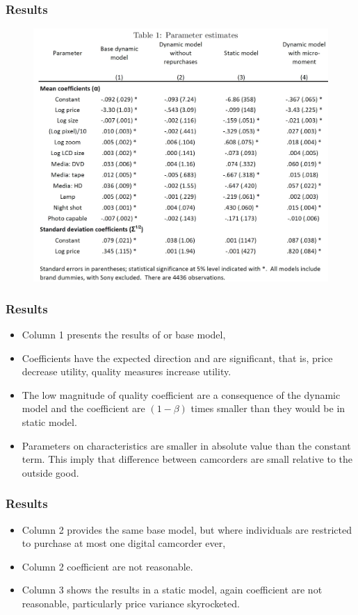 \documentclass{beamer}
\theoremstyle{definition}
\begin{document}
\begin{frame}
  \frametitle{Results}

  \begin{figure}
    \includegraphics[width=\linewidth]{Table 1.JPG}
  \end{figure}
\end{frame}

\begin{frame}
  \frametitle{Results}

  \begin{itemize}
    \item Column 1 presents the results of or base model,
    \item Coefficients have the expected direction and are significant, that is,
      price decrease utility, quality measures increase utility.
    \item The low magnitude of quality coefficient are a consequence of the
      dynamic model and the coefficient are $(1 - \beta)$ times smaller than they
      would be in static model.
    \item Parameters on characteristics are smaller in absolute value than the
      constant term. This imply that difference between camcorders are small
      relative to the outside good.
  \end{itemize}
\end{frame}

\begin{frame}
  \frametitle{Results}

  \begin{itemize}
    \item Column 2 provides the same base model, but where individuals are
      restricted to purchase at most one digital camcorder ever,
    \item Column 2 coefficient are not reasonable.
    \item Column 3 shows the results in a static model, again coefficient
      are not reasonable, particularly price variance skyrocketed.
  \end{itemize}
\end{frame}
\end{document}
